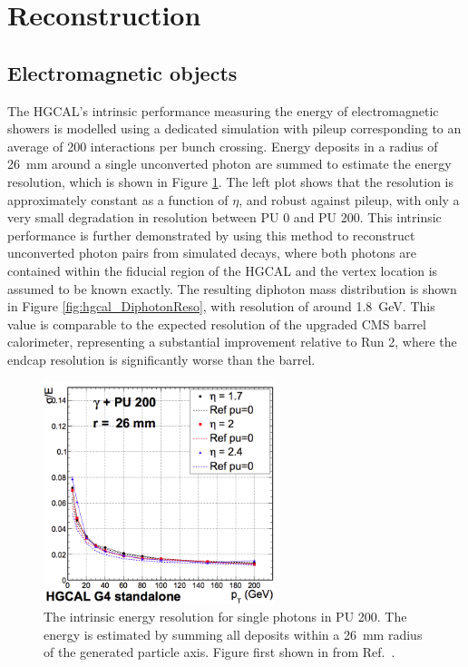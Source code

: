 \section{Reconstruction}

\subsection{Electromagnetic objects} %

The HGCAL's intrinsic performance measuring the energy of electromagnetic showers 
is modelled using a dedicated simulation 
with pileup corresponding to an average of 200 interactions per bunch crossing. %
Energy deposits in a radius of \SI{26}{mm} around a single unconverted photon 
are summed to estimate the energy resolution, 
which is shown in Figure \ref{fig:hgcal_PhotonReso}. %
The left plot shows that the resolution is approximately constant as a function of $\eta$, 
and robust against pileup, with only a very small degradation in resolution between PU 0 and PU 200. %
This intrinsic performance is further demonstrated 
by using this method to reconstruct unconverted photon pairs from simulated \Hgg decays, 
where both photons are contained within the fiducial region of the HGCAL 
and the vertex location is assumed to be known exactly. 
The resulting diphoton mass distribution is shown in Figure \ref{fig:hgcal_DiphotonReso}, 
with resolution of around \SI{1.8}{GeV}.
This value is comparable to the expected resolution of the upgraded CMS barrel calorimeter, 
representing a substantial improvement relative to Run 2, 
where the endcap resolution is significantly worse than the barrel. %

\begin{figure}[h!]
  \centering
  \includegraphics[width=0.6\textwidth]{Figures/HGCAL/SinglePhotonReso.png}
  \caption[HGCAL photon energy resolution.]
  {
    The intrinsic energy resolution for single photons in PU 200. 
    The energy is estimated by summing all deposits within a \SI{26}{mm} radius 
    of the generated particle axis. 
    Figure first shown in from Ref.~\cite{HGCAL}.
  }
  \label{fig:hgcal_PhotonReso}
\end{figure}

